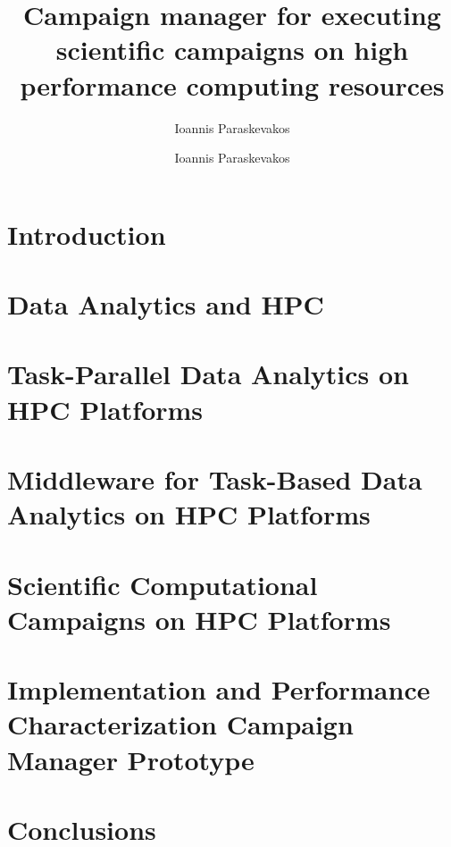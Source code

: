 \documentclass[final]{ruthesis}
\begin{document}
\author{Ioannis Paraskevakos}
\copyrightp
\title{Campaign manager for executing scientific campaigns on high performance computing resources}
\author{Ioannis Paraskevakos}					
\figurespage
\tablespage

\abstract{}
\acknowledgements{}

\beforepreface
\afterpreface

\chapter{Introduction}


\chapter{Data Analytics and HPC}


\chapter{Task-Parallel Data Analytics on HPC Platforms}


\chapter{Middleware for Task-Based Data Analytics on HPC Platforms}


\chapter{Scientific Computational Campaigns on HPC Platforms}

\chapter{Implementation and Performance Characterization Campaign Manager Prototype}

\chapter{Conclusions}




\end{document}

